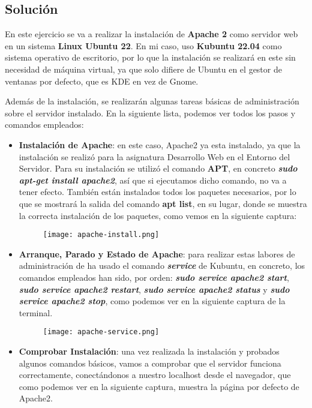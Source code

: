 \subsection{Solución}
En este ejercicio se va a realizar la instalación de \textbf{Apache 2} como servidor web en un sistema \textbf{Linux Ubuntu 22}. En mi caso, uso \textbf{Kubuntu 22.04 }como sistema operativo de escritorio, por lo que la instalación se realizará en este sin necesidad de máquina virtual, ya que solo difiere de Ubuntu en el gestor de ventanas por defecto, que es KDE en vez de Gnome.

Además de la instalación, se realizarán algunas tareas básicas de administración sobre el servidor instalado. En la siguiente lista, podemos ver todos los pasos y comandos empleados:

\begin{itemize}
    \item \textbf{Instalación de Apache}: en este caso, Apache2 ya esta instalado, ya que la instalación se realizó para la asignatura Desarrollo Web en el Entorno del Servidor. Para su instalación se utilizó el comando \textbf{APT}, en concreto \textbf{\textit{sudo apt-get install apache2}}, así que si ejecutamos dicho comando, no va a tener efecto. También están instalados todos los paquetes necesarios, por lo que se mostrará la salida del comando \textbf{apt list}, en su lugar, donde se muestra la correcta instalación de los paquetes, como vemos en la siguiente captura:

    \begin{figure}[H]
        \centering
        \texttt{[image: apache-install.png]}
    \end{figure}

    \item \textbf{Arranque, Parado y Estado de Apache}: para realizar estas labores de administración de ha usado el comando \textbf{\textit{service}} de Kubuntu, en concreto, los comandos empleados han sido, por orden: \textbf{\textit{sudo service apache2 start}}, \textbf{\textit{sudo service apache2 restart}}, \textbf{\textit{sudo service apache2 status}} y \textbf{\textit{sudo service apache2 stop}}, como podemos ver en la siguiente captura de la terminal.

    \begin{figure}[H]
        \centering
        \texttt{[image: apache-service.png]}
    \end{figure}

    \item \textbf{Comprobar Instalación}: una vez realizada la instalación y probados algunos comandos básicos, vamos a comprobar que el servidor funciona correctamente, conectándonos a nuestro localhost desde el navegador, que como podemos ver en la siguiente captura, muestra la página por defecto de Apache2.


\end{itemize}
